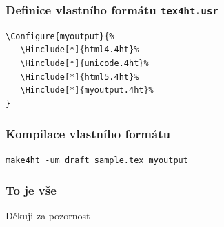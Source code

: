 \begin{frame}[fragile]
  \frametitle{Definice vlastního formátu \texttt{tex4ht.usr}}
  \begin{verbatim}
\Configure{myoutput}{% 
   \Hinclude[*]{html4.4ht}%
   \Hinclude[*]{unicode.4ht}%
   \Hinclude[*]{html5.4ht}%
   \Hinclude[*]{myoutput.4ht}% 
} 
  \end{verbatim}
\end{frame}

\begin{frame}[fragile]
  \frametitle{Kompilace vlastního formátu}
  \begin{verbatim}
make4ht -um draft sample.tex myoutput
  \end{verbatim}
\end{frame}

\begin{frame}
\frametitle{To je vše}
\begin{block}{}
Děkuji za pozornost
\end{block}
\end{frame}
